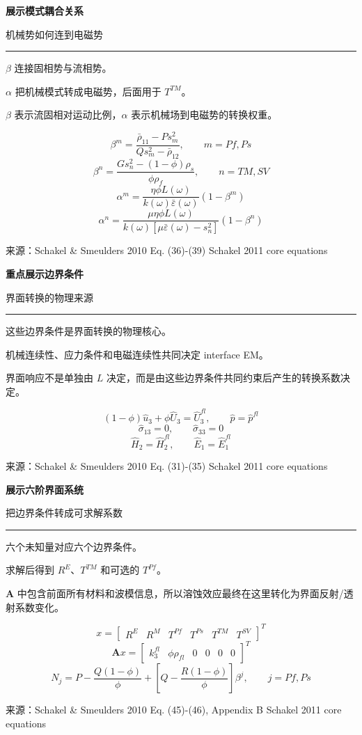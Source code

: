 \documentclass[12pt]{article}
\newcounter{slide}
\newcommand{\TitleFont}{\fontsize{32}{38}\selectfont\bfseries}
\newcommand{\TagFont}{\fontsize{16}{20}\selectfont}
\newcommand{\BodyFont}{\fontsize{18}{24}\selectfont}
\newcommand{\SmallFont}{\fontsize{16}{21}\selectfont}
\newcommand{\FootFont}{\fontsize{12}{14}\selectfont}
\newcommand{\FormulaFont}{\fontsize{18}{23}\selectfont}
\newcommand{\src}[1]{\vfill{\SmallFont\color{Grey}来源：#1}}
\newcommand{\one}[1]{{\BodyFont\color{Ink}#1}}
\newcommand{\explain}[1]{{\SmallFont\color{Grey}#1}}
\newenvironment{slide}[2]{%
  \clearpage
  \stepcounter{slide}
  \thispagestyle{empty}
  {\TitleFont\color{Ink}#1}\par
  \vspace{0.05in}
  {\TagFont\color{Blue}#2}\par
  \vspace{0.11in}
  {\color{Blue}\rule{\textwidth}{1.6pt}}\par
  \vspace{0.22in}
}{%
  \vfill
  {\FootFont\color{Grey}Schakel 2011 core equations}
  \hfill
  {\FootFont\color{Grey}\theslide}
}
\newcommand{\twocol}[2]{%
  \begin{minipage}[t]{0.32\textwidth}
  #1
  \end{minipage}\hfill
  \begin{minipage}[t]{0.63\textwidth}
  #2
  \end{minipage}
}
\begin{document}
\begin{slide}{展示模式耦合关系}{机械势如何连到电磁势}
\twocol{
\one{$\beta$ 连接固相势与流相势。}\par
\vspace{0.20in}
\one{$\alpha$ 把机械模式转成电磁势，后面用于 $T^{TM}$。}\par
\vspace{0.20in}
\explain{$\beta$ 表示流固相对运动比例，$\alpha$ 表示机械场到电磁势的转换权重。}
}{
{\FormulaFont
\[
\beta^m=
\frac{\bar{\rho}_{11}-Ps_m^2}
{Qs_m^2-\bar{\rho}_{12}},
\qquad
m=Pf,Ps
\]
\[
\beta^n=
\frac{Gs_n^2-(1-\phi)\rho_s}{\phi\rho_f},
\qquad
n=TM,SV
\]
\[
\alpha^m=
\frac{\eta\phi L(\omega)}
{k(\omega)\bar{\varepsilon}(\omega)}
\left(1-\beta^m\right)
\]
\[
\alpha^n=
\frac{\mu\eta\phi L(\omega)}
{k(\omega)\left[\mu\bar{\varepsilon}(\omega)-s_n^2\right]}
\left(1-\beta^n\right)
\]
}
}
\src{Schakel \& Smeulders 2010 Eq. (36)-(39)}
\end{slide}

\begin{slide}{重点展示边界条件}{界面转换的物理来源}
\twocol{
\one{这些边界条件是界面转换的物理核心。}\par
\vspace{0.20in}
\one{机械连续性、应力条件和电磁连续性共同决定 interface EM。}\par
\vspace{0.20in}
\explain{界面响应不是单独由 $L$ 决定，而是由这些边界条件共同约束后产生的转换系数决定。}
}{
{\FormulaFont
\[
(1-\phi)\hat{u}_3+\phi\hat{U}_3=\hat{U}_3^{fl},
\qquad
\hat{p}=\hat{p}^{fl}
\]
\[
\hat{\sigma}_{13}=0,
\qquad
\hat{\sigma}_{33}=0
\]
\[
\hat{H}_2=\hat{H}_2^{fl},
\qquad
\hat{E}_1=\hat{E}_1^{fl}
\]
}
}
\src{Schakel \& Smeulders 2010 Eq. (31)-(35)}
\end{slide}

\begin{slide}{展示六阶界面系统}{把边界条件转成可求解系数}
\twocol{
\one{六个未知量对应六个边界条件。}\par
\vspace{0.20in}
\one{求解后得到 $R^E$、$T^{TM}$ 和可选的 $T^{Pf}$。}\par
\vspace{0.20in}
\explain{$\mathbf{A}$ 中包含前面所有材料和波模信息，所以溶蚀效应最终在这里转化为界面反射/透射系数变化。}
}{
{\FormulaFont
\[
x=
\begin{bmatrix}
R^E & R^M & T^{Pf} & T^{Ps} & T^{TM} & T^{SV}
\end{bmatrix}^{T}
\]
\[
\mathbf{A}x=
\begin{bmatrix}
k_3^{fl} & \phi\rho_{fl} & 0 & 0 & 0 & 0
\end{bmatrix}^{T}
\]
\[
N_j=
P-\frac{Q(1-\phi)}{\phi}
+
\left[
Q-\frac{R(1-\phi)}{\phi}
\right]\beta^j,
\qquad j=Pf,Ps
\]
}
}
\src{Schakel \& Smeulders 2010 Eq. (45)-(46), Appendix B}
\end{slide}
\end{document}
